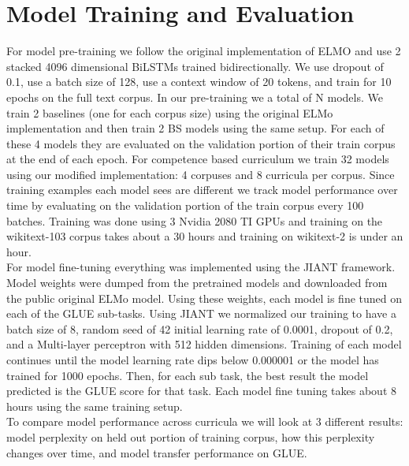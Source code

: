 \section{Model Training and Evaluation}
\label{chap:method:sec:training}
For model pre-training we follow the original implementation of ELMO and use 2 stacked 4096 dimensional BiLSTMs trained bidirectionally. We use dropout of 0.1, use a batch size of 128, use a context window of 20 tokens, and train for 10 epochs on the full text corpus. In our pre-training we a total of N models. We train 2 baselines (one for each corpus size) using the original ELMo implementation and then train 2 BS models using the same setup. For each of these 4 models they are evaluated on the validation portion of their train corpus at the end of each epoch.  For competence based curriculum we train 32 models using our modified implementation: 4 corpuses and 8 curricula per corpus. Since training examples each model sees are different we track model performance over time by evaluating on the validation portion of the train corpus every 100 batches.  Training was done using 3 Nvidia 2080 TI GPUs and training on the wikitext-103 corpus takes about a 30 hours and training on wikitext-2 is under an hour. \\ 
For model fine-tuning everything was implemented using the JIANT framework. Model weights were dumped from the pretrained models and downloaded from the public original ELMo model. Using these weights, each model is fine tuned on each of the GLUE sub-tasks. Using JIANT we normalized our training to have a batch size of 8, random seed of 42 initial learning rate of 0.0001, dropout of 0.2, and a Multi-layer perceptron with 512 hidden dimensions. Training of each model continues until the model learning rate dips below 0.000001 or the model has trained for 1000 epochs. Then, for each sub task, the best result the model predicted is the GLUE score for that task. Each model fine tuning takes about 8 hours using the same training setup. \\
To compare model performance across curricula we will look at 3 different results: model perplexity on held out portion of training corpus, how this perplexity changes over time, and model transfer performance on GLUE. 